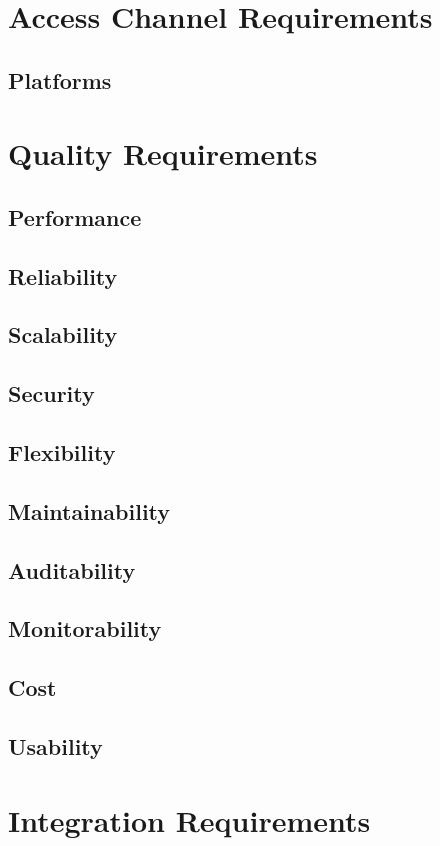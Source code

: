 \documentclass[a4paper]{article}
\begin{document}
\section{Access Channel Requirements}
\subsection{Platforms}

\section{Quality Requirements}
\subsection{Performance}
\subsection{Reliability}
\subsection{Scalability}
\subsection{Security}
\subsection{Flexibility}
\subsection{Maintainability}
\subsection{Auditability}
\subsection{Monitorability}
\subsection{Cost}
\subsection{Usability}

\section{Integration Requirements}
\end{document}
